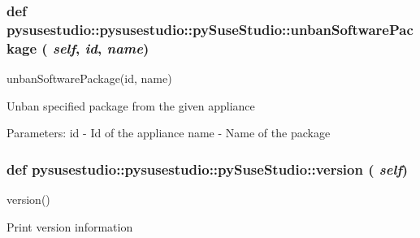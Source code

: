  \hypertarget{classpysusestudio_1_1pysusestudio_1_1py_suse_studio_a00393cbb1c4f270a027ba6cb0be25a6e}{
\subsubsection[{unbanSoftwarePackage}]{\setlength{\rightskip}{0pt plus 5cm}def pysusestudio::pysusestudio::pySuseStudio::unbanSoftwarePackage ( {\em self}, \/   {\em id}, \/   {\em name})}}
\label{classpysusestudio_1_1pysusestudio_1_1py_suse_studio_a00393cbb1c4f270a027ba6cb0be25a6e}
\begin{DoxyVerb}unbanSoftwarePackage(id, name)

            Unban specified package from the given appliance
            
            Parameters:
id - Id of the appliance
name - Name of the package

\end{DoxyVerb}
 \hypertarget{classpysusestudio_1_1pysusestudio_1_1py_suse_studio_adf9b20edaae96febee362f9c33c4c675}{
\subsubsection[{version}]{\setlength{\rightskip}{0pt plus 5cm}def pysusestudio::pysusestudio::pySuseStudio::version ( {\em self})}}
\label{classpysusestudio_1_1pysusestudio_1_1py_suse_studio_adf9b20edaae96febee362f9c33c4c675}
\begin{DoxyVerb}version()

            Print version information

\end{DoxyVerb}
 

